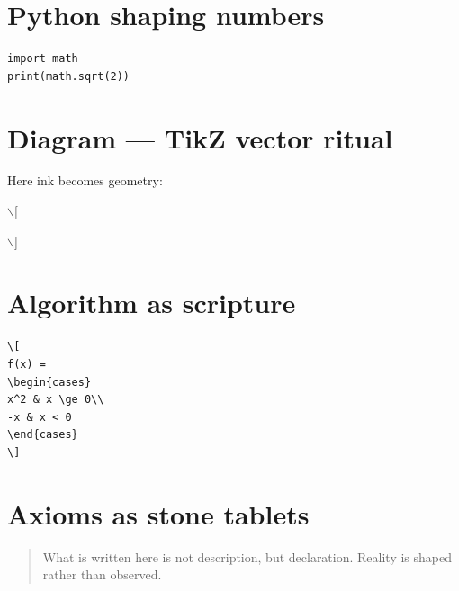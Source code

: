 \documentclass[12pt]{article}
\begin{document}
\section*{Python shaping numbers}
\label{sec:org62245e2}
\begin{verbatim}
import math
print(math.sqrt(2))
\end{verbatim}
\section*{Diagram — TikZ vector ritual}
\label{sec:org22b3cf8}
Here ink becomes geometry:

$\backslash$[
$\backslash$]
\section*{Algorithm as scripture}
\label{sec:org4f00901}
\begin{verbatim}
\[
f(x) = 
\begin{cases}
x^2 & x \ge 0\\
-x & x < 0
\end{cases}
\]
\end{verbatim}
\section*{Axioms as stone tablets}
\label{sec:org80073c6}
\begin{quote}
What is written here is not description,
but declaration.
Reality is shaped rather than observed.
\end{quote}
\end{document}
